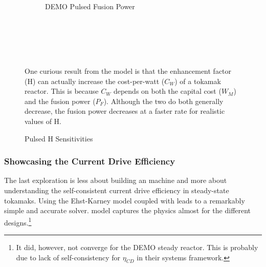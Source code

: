 \begin{figure*}
\begin{subfigure}[t]{0.45\textwidth}
\begin{adjustbox}{width=\textwidth}
			\Large
			
		\end{adjustbox}
        \caption{DEMO Pulsed Fusion Power}
    \end{subfigure}
    \hfill \hfill ~\\ ~\\ ~\\
    \caption{Pulsed H Sensitivities}
    \label{fig:pulsed_h} ~ \\
    \small{ One curious result from the model is that the enhancement factor (H) can actually increase the cost-per-watt ($C_W$) of a tokamak reactor. This is because $C_W$ depends on both the capital cost ($W_M$) and the fusion power ($P_F$). Although the two do both generally decrease, the fusion power decreases at a faster rate for realistic values of H. }
\end{figure*}

\subsubsection{Showcasing the Current Drive Efficiency}

The last exploration is less about building an  machine and more about understanding the self-consistent current drive efficiency in steady-state tokamaks. Using the Ehst-Karney model \cite{ehstkarney} coupled with \cite{jeff} leads to a remarkably simple and accurate solver.  model captures the physics almost  for the different designs.\footnote{It did, however, not converge for the DEMO steady reactor. This is probably due to lack of self-consistency for $\eta_{CD}$ in their systems framework. }

